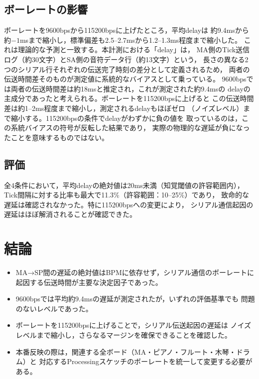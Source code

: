 \documentclass[11pt,a4paper]{ltjsarticle}
\begin{document}
\subsection{ボーレートの影響}
ボーレートを9600bpsから115200bpsに上げたところ，平均delayは
約9.4msから約$-1$msまで縮小し，標準偏差も2.5--2.7msから1.2--1.3ms程度まで縮小した。
これは理論的な予測と一致する。本計測における「delay」は，
MA側のTick送信ログ（約30文字）とSA側の音符データ行（約13文字）という，
長さの異なる2つのシリアル行それぞれの伝送完了時刻の差分として定義されるため，
両者の伝送時間差そのものが測定値に系統的なバイアスとして乗っている。
9600bpsでは両者の伝送時間差は約18msと推定され，これが測定された約9.4msの
delayの主成分であったと考えられる。ボーレートを115200bpsに上げると
この伝送時間差は約1--2ms程度まで縮小し，測定されるdelayもほぼゼロ
（ノイズレベル）まで縮小する。115200bpsの条件でdelayがわずかに負の値を
取っているのは，この系統バイアスの符号が反転した結果であり，
実際の物理的な遅延が負になったことを意味するものではない。

\subsection{評価}
全4条件において，平均delayの絶対値は20ms未満（知覚閾値の許容範囲内），
Tick間隔に対する比率も最大で11.3\%（許容範囲：10--25\%）であり，
致命的な遅延は確認されなかった。特に115200bpsへの変更により，
シリアル通信起因の遅延はほぼ解消されることが確認できた。

\section{結論}
\begin{itemize}
  \item MA→SP間の遅延の絶対値はBPMに依存せず，シリアル通信のボーレートに
        起因する伝送時間が主要な決定因子であった。
  \item 9600bpsでは平均約9.4msの遅延が測定されたが，いずれの評価基準でも
        問題のないレベルであった。
  \item ボーレートを115200bpsに上げることで，シリアル伝送起因の遅延は
        ノイズレベルまで縮小し，さらなるマージンを確保できることを確認した。
  \item 本番反映の際は，関連する全ボード（MA・ピアノ・フルート・木琴・ドラム）と
        対応するProcessingスケッチのボーレートを統一して変更する必要がある。
\end{itemize}
\end{document}

